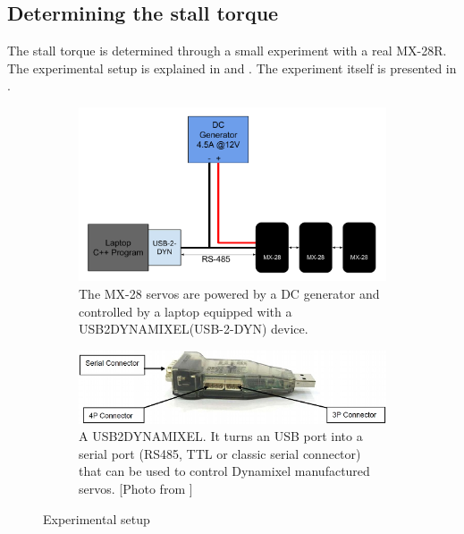 \subsection{Determining the stall torque}
The stall torque is determined through a small experiment with a real MX-28R. The experimental setup is explained in  and . The experiment itself is presented in .

\begin{figure}[htp]
\center
    \begin{subfigure}[b]{0.45\textwidth}
    \includegraphics[width=\textwidth]{figures/exp_setup}
    \caption[Experimental setup]{The MX-28 servos are powered by a DC generator and controlled by a laptop equipped with a USB2DYNAMIXEL(USB-2-DYN) device.}
    \label{fig:dc_chain}
    \end{subfigure}
    \hfill
    \begin{subfigure}[b]{0.45\textwidth}
    \includegraphics[width = \textwidth]{figures/u2d}
    \caption[USB2DYNAMIXEL]{A USB2DYNAMIXEL. It turns an USB port into a serial port (RS485, TTL or classic serial connector) that can be used to control Dynamixel manufactured servos. [Photo from \cite{usb2dyn_manual}]}
    \label{fig:usb2dyn}
    \end{subfigure}
    \caption{Experimental setup \label{fig:exp_setup}}
\end{figure}


